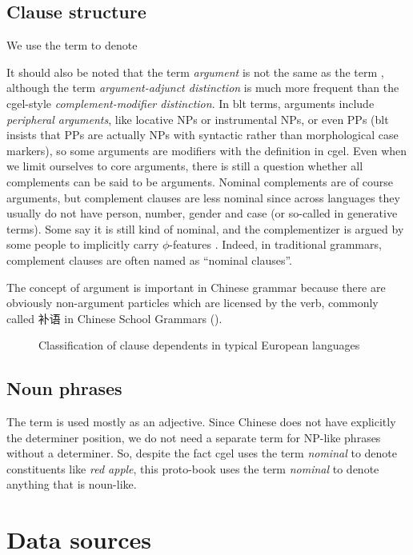 \documentclass[../main.tex]{subfiles}
\begin{document}
\subsection{Clause structure}

We use the term  to denote %

It should also be noted that the term \emph{argument} is not the same as the term , 
although the term \emph{argument-adjunct distinction} is much more frequent than the \ac{cgel}-style 
\emph{complement-modifier distinction}. In \ac{blt} terms, arguments include \emph{peripheral arguments},
like locative NPs or instrumental NPs, or even PPs (\ac{blt} insists that PPs are actually NPs with 
syntactic rather than morphological case markers), so some arguments are modifiers with the definition 
in \ac{cgel}. Even when we limit ourselves to core arguments, there is still a question whether 
all complements can be said to be arguments. Nominal complements are of course arguments, but 
complement clauses are less nominal since across languages they usually do not have person, number, gender and 
case (or so-called  in generative terms). Some say it is still kind of nominal, 
and the complementizer is argued by some people to implicitly carry $\phi$-features \citep{complement-clause}.
Indeed, in traditional grammars, complement clauses are often named as ``nominal clauses''.

The concept of argument is important in Chinese grammar because there are obviously non-argument particles 
which are licensed by the verb, commonly called 补语 in Chinese School Grammars ().

\begin{figure}
    \centering
    
    \caption{Classification of clause dependents in typical European languages}
\end{figure}


\subsection{Noun phrases}

The term  is used mostly as an adjective. Since Chinese does not have 
explicitly the determiner position, we do not need a separate term for NP-like phrases without a determiner.
So, despite the fact \ac{cgel} uses the term \emph{nominal} to denote constituents like \emph{red apple}, 
this proto-book uses the term \emph{nominal} to denote anything that is noun-like.

\section{Data sources}

\end{document}
